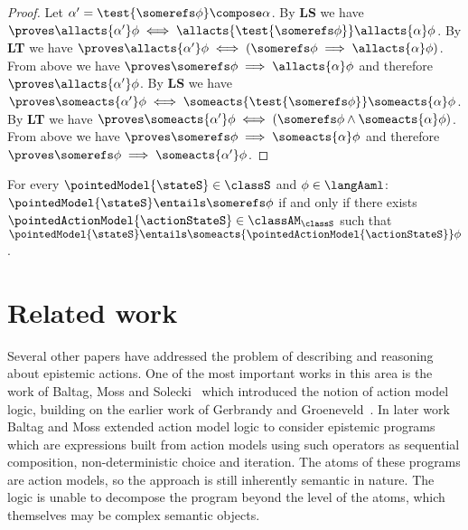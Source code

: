 \documentclass[twoside]{aiml14}
\begin{document}
\begin{proof}
      Let $\alpha' = \test{\somerefs \phi} \compose \alpha$.
      By {\bf LS} we have $\proves \allacts{\alpha'} \phi \iff \allacts{\test{\somerefs \phi}} \allacts{\alpha} \phi$.
      By {\bf LT} we have $\proves \allacts{\alpha'} \phi \iff (\somerefs \phi \implies \allacts{\alpha} \phi)$.
      From above we have $\proves \somerefs \phi \implies \allacts{\alpha} \phi$
      and therefore $\proves \allacts{\alpha'} \phi$.
      By {\bf LS} we have $\proves \someacts{\alpha'} \phi \iff \someacts{\test{\somerefs \phi}} \someacts{\alpha} \phi$.
      By {\bf LT} we have $\proves \someacts{\alpha'} \phi \iff (\somerefs \phi \land \someacts{\alpha} \phi)$.
      From above we have $\proves \somerefs \phi \implies \someacts{\alpha} \phi$
      and therefore $\proves \somerefs \phi \implies \someacts{\alpha'} \phi$.
  \end{proof}

  \begin{corollary}
      For every $\pointedModel{\stateS} \in \classS$ and $\phi \in \langAaml$: 
      $\pointedModel{\stateS} \entails \somerefs \phi$ if and only if 
      there exists $\pointedActionModel{\actionStateS} \in \classAM_\classS$ 
      such that $\pointedModel{\stateS} \entails \someacts{\pointedActionModel{\actionStateS}} \phi$.
  \end{corollary}

  \section{Related work}\label{related-work}

  Several other papers have addressed the problem of describing and reasoning
  about epistemic actions.  One of the most important works in this area is the
  work of Baltag, Moss and Solecki~\cite{baltag1998} which introduced the
  notion of action model logic, building on the earlier work of Gerbrandy and
  Groeneveld~\cite{gerbrandy1997}. In later work Baltag and Moss extended
  action model logic to consider epistemic programs~\cite{baltag2005} which are
  expressions built from action models using such operators as sequential
  composition, non-deterministic choice and iteration. The atoms of these
  programs are action models, so the approach is still inherently semantic in
  nature. The logic is unable to decompose the program beyond the level of the
  atoms, which themselves may be complex semantic objects.
  
\end{document}
